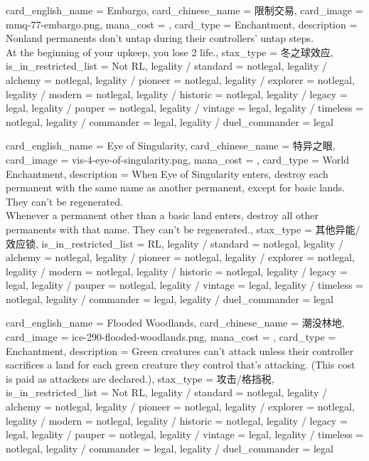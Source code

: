 \documentclass[lang = cn, color = black, 10pt]{AllThatStax}
\begin{document}
\card
{
	card_english_name = {Embargo},
	card_chinese_name = {限制交易},
	card_image = mmq-77-embargo.png,
	mana_cost = ,
	card_type = Enchantment,
	description = {Nonland permanents don't untap during their controllers' untap steps.\\
		At the beginning of your upkeep, you lose 2 life.},
	stax_type = 冬之球效应,
	is_in_restricted_list = Not RL,
	legality / standard = notlegal,
	legality / alchemy = notlegal,
	legality / pioneer = notlegal,
	legality / explorer = notlegal,
	legality / modern = notlegal,
	legality / historic = notlegal,
	legality / legacy = legal,
	legality / pauper = notlegal,
	legality / vintage = legal,
	legality / timeless = notlegal,
	legality / commander = legal,
	legality / duel_commander = legal
}

\card
{
	card_english_name = {Eye of Singularity},
	card_chinese_name = {特异之眼},
	card_image = vis-4-eye-of-singularity.png,
	mana_cost = ,
	card_type = World Enchantment,
	description = {When Eye of Singularity enters, destroy each permanent with the same name as another permanent, except for basic lands. They can't be regenerated.\\
		Whenever a permanent other than a basic land enters, destroy all other permanents with that name. They can't be regenerated.},
	stax_type = 其他异能/效应锁,
	is_in_restricted_list = RL,
	legality / standard = notlegal,
	legality / alchemy = notlegal,
	legality / pioneer = notlegal,
	legality / explorer = notlegal,
	legality / modern = notlegal,
	legality / historic = notlegal,
	legality / legacy = legal,
	legality / pauper = notlegal,
	legality / vintage = legal,
	legality / timeless = notlegal,
	legality / commander = legal,
	legality / duel_commander = legal
}

\card
{
	card_english_name = {Flooded Woodlands},
	card_chinese_name = {潮没林地},
	card_image = ice-290-flooded-woodlands.png,
	mana_cost = ,
	card_type = Enchantment,
	description = {Green creatures can't attack unless their controller sacrifices a land for each green creature they control that's attacking. (This cost is paid as attackers are declared.)},
	stax_type = 攻击/格挡税,
	is_in_restricted_list = Not RL,
	legality / standard = notlegal,
	legality / alchemy = notlegal,
	legality / pioneer = notlegal,
	legality / explorer = notlegal,
	legality / modern = notlegal,
	legality / historic = notlegal,
	legality / legacy = legal,
	legality / pauper = notlegal,
	legality / vintage = legal,
	legality / timeless = notlegal,
	legality / commander = legal,
	legality / duel_commander = legal
}
\end{document}
